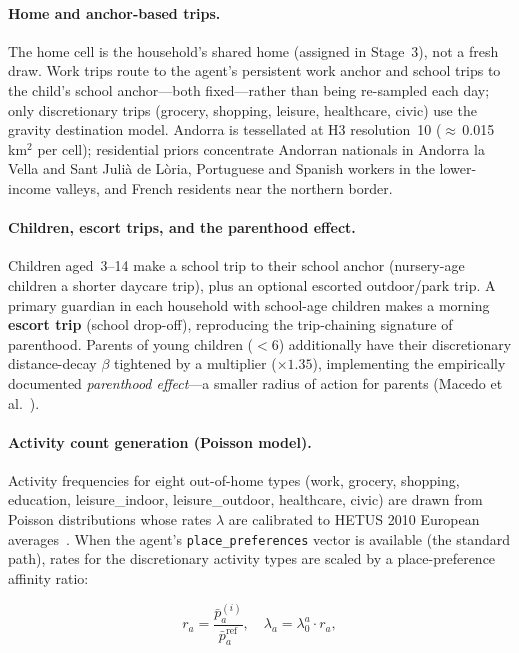 \documentclass[a4paper,12pt]{article}
\begin{document}
\paragraph{Home and anchor-based trips.}
The home cell is the household's shared home (assigned in Stage~3), not a fresh draw.
Work trips route to the agent's persistent work anchor and school trips to the child's
school anchor---both fixed---rather than being re-sampled each day; only discretionary
trips (grocery, shopping, leisure, healthcare, civic) use the gravity destination
model. Andorra is tessellated at H3 resolution~10 ($\approx$\,0.015\,km$^2$ per cell);
residential priors concentrate Andorran nationals in Andorra la Vella and Sant
Juli\`a de L\`oria, Portuguese and Spanish workers in the lower-income valleys, and
French residents near the northern border.

\paragraph{Children, escort trips, and the parenthood effect.}
Children aged~3--14 make a school trip to their school anchor (nursery-age children a
shorter daycare trip), plus an optional escorted outdoor/park trip. A primary guardian
in each household with school-age children makes a morning \textbf{escort trip}
(school drop-off), reproducing the trip-chaining signature of parenthood. Parents of
young children ($<6$) additionally have their discretionary distance-decay $\beta$
tightened by a multiplier ($\times 1.35$), implementing the empirically documented
\emph{parenthood effect}---a smaller radius of action for parents
(Macedo et al.~\cite{macedo2026parenthood}).

\paragraph{Activity count generation (Poisson model).}
Activity frequencies for eight out-of-home types (work, grocery, shopping,
education, leisure\_indoor, leisure\_outdoor, healthcare, civic) are drawn from
Poisson distributions whose rates $\lambda$ are calibrated to HETUS 2010
European averages~\cite{hetus2010}. When the agent's \texttt{place\_preferences}
vector is available (the standard path), rates for the discretionary activity
types are scaled by a place-preference affinity ratio:

\begin{equation}
  r_a = \frac{\bar{p}_a^{(i)}}{\bar{p}_a^{\text{ref}}},
  \quad
  \lambda_a = \lambda_0^a \cdot r_a,
\end{equation}
\end{document}
